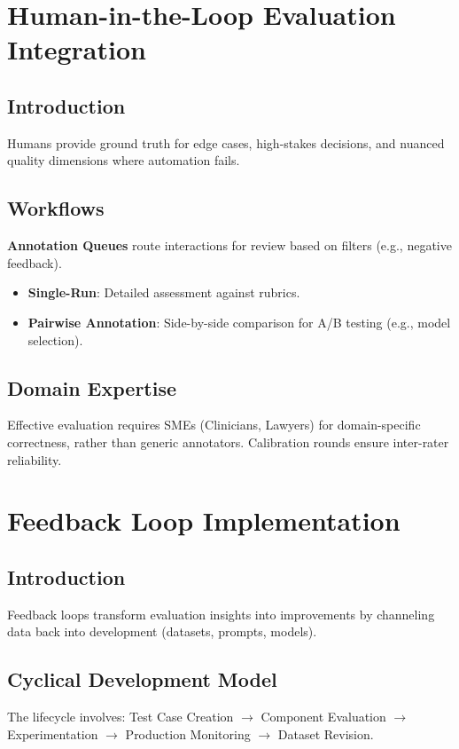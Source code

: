 \begin{TNtwocol}
\section{Human-in-the-Loop Evaluation Integration }
\subsection{Introduction}
Humans provide ground truth for edge cases, high-stakes decisions, and nuanced quality dimensions where automation fails.

\subsection{Workflows}
\textbf{Annotation Queues} route interactions for review based on filters (e.g., negative feedback).
\begin{itemize}
    \item \textbf{Single-Run}: Detailed assessment against rubrics.
    \item \textbf{Pairwise Annotation}: Side-by-side comparison for A/B testing (e.g., model selection).
\end{itemize}

\subsection{Domain Expertise}
Effective evaluation requires SMEs (Clinicians, Lawyers) for domain-specific correctness, rather than generic annotators. Calibration rounds ensure inter-rater reliability.
\section{Feedback Loop Implementation }
\subsection{Introduction}
Feedback loops transform evaluation insights into improvements by channeling data back into development (datasets, prompts, models).

\subsection{Cyclical Development Model}
The lifecycle involves: Test Case Creation $\rightarrow$ Component Evaluation $\rightarrow$ Experimentation $\rightarrow$ Production Monitoring $\rightarrow$ Dataset Revision.


\end{TNtwocol}
